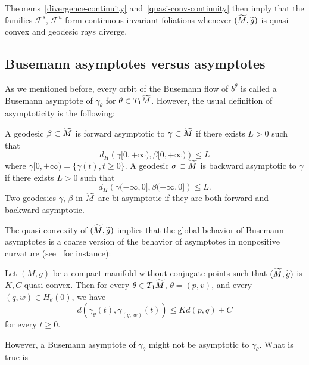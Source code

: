 \documentclass[AHL,Unicode,longabstracts,published]{cedram}
\newcommand{\clF}{\mathcal{F}}
\let\oldtilde\tilde
\renewcommand*{\tilde}[1]{\mathchoice{\widetilde{#1}}{\widetilde{#1}}{\oldtilde{#1}}{\oldtilde{#1}}}
\begin{document}
Theorems~\ref{divergence-continuity} and~\ref{quasi-conv-continuity} then imply that the families $\clF^{s}$, $\clF^{u}$ form continuous invariant foliations whenever $(\tilde{M}, \tilde{g})$ is quasi-convex and geodesic rays diverge.


\subsection{Busemann asymptotes versus asymptotes}

As we mentioned before, every orbit of the Busemann flow of $b^{\theta}$ is called a Busemann asymptote of $\gamma_{\theta}$ for $\theta \in T_{1}\tilde{M}$. However, the usual definition of asymptoticity is the following:

\begin{defi}
A geodesic $\beta \subset \tilde{M}$ is forward asymptotic to $\gamma \subset \tilde{M}$ if there exists $L>0$ such that
\[
d_{H}\left(\gamma[0,+\infty), \beta[0,+\infty)\right) \leq L
\]
where $\gamma[0,+\infty) = \{ \gamma(t), t \geq 0\}$. A geodesic $\sigma \subset \tilde{M}$ is backward asymptotic to $\gamma$ if there exists $L>0$ such that
\[
d_{H}\left(\gamma(-\infty,0], \beta(-\infty,0]\right) \leq L.
\]
Two geodesics $\gamma$, $\beta$ in $\tilde{M}$ are bi-asymptotic if they are both forward and backward asymptotic.
\end{defi}

The quasi-convexity of $(\tilde{M}, \tilde{g})$ implies that the global behavior of Busemann asymptotes is a coarse version of the behavior of asymptotes in nonpositive curvature (see~\cite{kn:Ruggiero-Ensaios} for instance):

\begin{lemm}\label{asymptotic-quasi-convex}
Let $(M,g)$ be a compact manifold without conjugate points such that $(\tilde{M}, \tilde{g})$ is $K,C$ quasi-convex. Then for every $\theta \in T_{1}\tilde{M}$, $\theta= (p,v)$, and every $(q, w) \in H_{\theta}(0)$, we have
\[
d\left(\gamma_{\theta}(t), \gamma_{(q,\,w)}(t)\right) \leq Kd(p,q) +C
\]
for every $ t \geq 0$.
\end{lemm}

However, a Busemann asymptote of $\gamma_{\theta}$ might not be asymptotic to $\gamma_{\theta}$. What is true is
\end{document}
